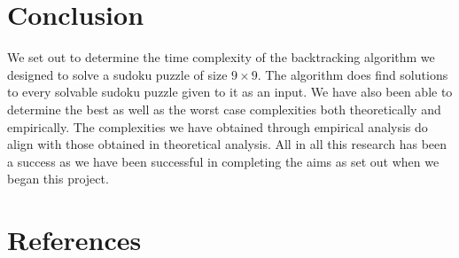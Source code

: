 \documentclass[12pt,a4paper,titlepage]{article}
\begin{document}
\newpage
\section{Conclusion}

We set out to determine the time complexity of the backtracking algorithm we designed to solve a sudoku puzzle of size $ 9 \times 9$. The algorithm does find solutions to every solvable sudoku puzzle given to it as an input. We have also been able to determine the best as well as the worst case complexities both theoretically and empirically. The complexities we have obtained through empirical analysis do align with those obtained in theoretical analysis. All in all this research has been a success as we have been successful in completing the aims as set out when we began this project.

\section{References}
\end{document}
